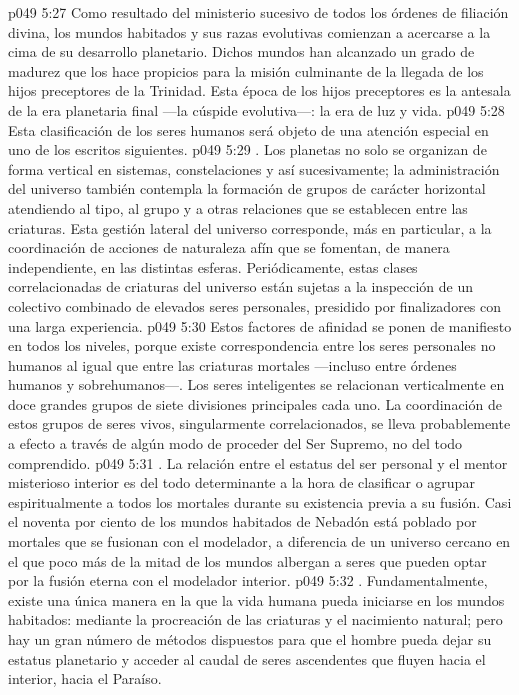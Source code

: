 \vs p049 5:27 Como resultado del ministerio sucesivo de todos los órdenes de filiación divina, los mundos habitados y sus razas evolutivas comienzan a acercarse a la cima de su desarrollo planetario. Dichos mundos han alcanzado un grado de madurez que los hace propicios para la misión culminante de la llegada de los hijos preceptores de la Trinidad. Esta época de los hijos preceptores es la antesala de la era planetaria final ---la cúspide evolutiva---: la era de luz y vida.
\vs p049 5:28 Esta clasificación de los seres humanos será objeto de una atención especial en uno de los escritos siguientes.
\vs p049 5:29 . Los planetas no solo se organizan de forma vertical en sistemas, constelaciones y así sucesivamente; la administración del universo también contempla la formación de grupos de carácter horizontal atendiendo al tipo, al grupo y a otras relaciones que se establecen entre las criaturas. Esta gestión lateral del universo corresponde, más en particular, a la coordinación de acciones de naturaleza afín que se fomentan, de manera independiente, en las distintas esferas. Periódicamente, estas clases correlacionadas de criaturas del universo están sujetas a la inspección de un colectivo combinado de elevados seres personales, presidido por finalizadores con una larga experiencia.
\vs p049 5:30 Estos factores de afinidad se ponen de manifiesto en todos los niveles, porque existe correspondencia entre los seres personales no humanos al igual que entre las criaturas mortales ---incluso entre órdenes humanos y sobrehumanos---. Los seres inteligentes se relacionan verticalmente en doce grandes grupos de siete divisiones principales cada uno. La coordinación de estos grupos de seres vivos, singularmente correlacionados, se lleva probablemente a efecto a través de algún modo de proceder del Ser Supremo, no del todo comprendido.
\vs p049 5:31 . La relación entre el estatus del ser personal y el mentor misterioso interior es del todo determinante a la hora de clasificar o agrupar espiritualmente a todos los mortales durante su existencia previa a su fusión. Casi el noventa por ciento de los mundos habitados de Nebadón está poblado por mortales que se fusionan con el modelador, a diferencia de un universo cercano en el que poco más de la mitad de los mundos albergan a seres que pueden optar por la fusión eterna con el modelador interior.
\vs p049 5:32 . Fundamentalmente, existe una única manera en la que la vida humana pueda iniciarse en los mundos habitados: mediante la procreación de las criaturas y el nacimiento natural; pero hay un gran número de métodos dispuestos para que el hombre pueda dejar su estatus planetario y acceder al caudal de seres ascendentes que fluyen hacia el interior, hacia el Paraíso.
